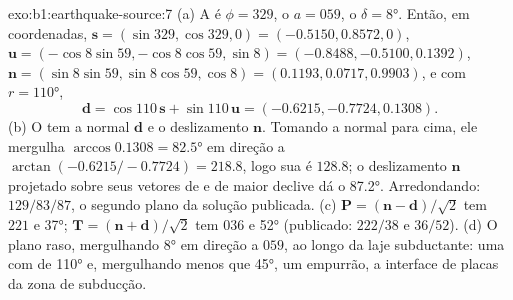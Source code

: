 \begin{solution}{exo:b1:earthquake-source:7}
(a) A  é $\phi = 329$, o  $a = 059$, o  $\delta =
\ang{8}$. Então, em coordenadas, $\mathbf s = (\sin329, \cos329, 0) = (-0.5150, 0.8572, 0)$,
$\mathbf u = (-\cos8\sin59, -\cos8\cos59, \sin8) = (-0.8488, -0.5100, 0.1392)$,
$\mathbf n = (\sin8\sin59, \sin8\cos59, \cos8) = (0.1193, 0.0717, 0.9903)$,
e com $r = \ang{110}$,
\[
  \mathbf d = \cos110\,\mathbf s + \sin110\,\mathbf u = (-0.6215, -0.7724, 0.1308) .
\]
(b) O  tem a normal $\mathbf d$ e o deslizamento $\mathbf n$.
Tomando a normal para cima, ele mergulha $\arccos 0.1308 = \ang{82.5}$ em direção a
$\arctan(-0.6215/-0.7724) = 218.8$, logo sua  é $128.8$; o deslizamento
$\mathbf n$ projetado sobre seus vetores de  e de maior declive dá o 
\ang{87.2}. Arredondando: $129/83/87$, o segundo plano da solução publicada.
(c) $\mathbf P = (\mathbf n - \mathbf d)/\sqrt2$ tem  $221$ e 
\ang{37}; $\mathbf T = (\mathbf n + \mathbf d)/\sqrt2$ tem  $036$ e 
\ang{52} (publicado: $222/38$ e $36/52$). (d) O plano raso, mergulhando
\ang{8} em direção a $059$, ao longo da laje subductante: uma  com  de
\ang{110} e, mergulhando menos que \ang{45}, um empurrão, a interface de placas da zona de subducção.
\end{solution}

